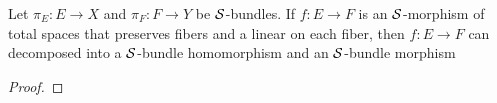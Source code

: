 \begin{proposition}
	Let $\pi_E: E \to X$ and $\pi_F: F \to Y$ be $\mathcal{S}$-bundles. If $f: E \to F$ is an $\mathcal{S}$-morphism of total spaces that preserves fibers and a linear on each fiber, then $f: E \to F$ can decomposed into a $\mathcal{S}$-bundle homomorphism and an $\mathcal{S}$-bundle morphism
	\begin{center}
	\end{center}
	\begin{proof}
	\end{proof}
\end{proposition}